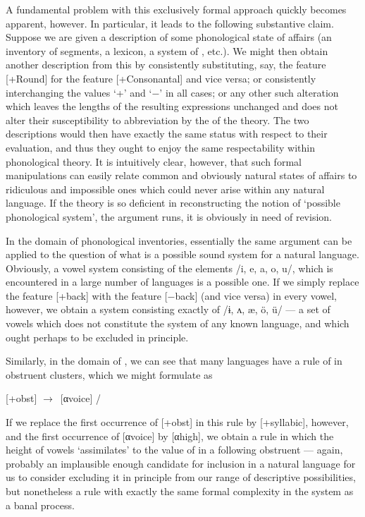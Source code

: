 A fundamental problem with this exclusively formal approach quickly
be\-comes apparent, however. In particular, it leads to the following
substantive claim. Suppose we are given a description of some
phonological state of affairs (an inventory of segments, a lexicon, a
system of , etc.). We might then obtain another
description from this by consistently substituting, say, the feature
[+Round] for the feature [+Consonantal] and vice versa; or
consistently interchanging the values `+' and `$-$' in all cases; or
any other such alteration which leaves the lengths of the resulting
expressions unchanged and does not alter their susceptibility to
abbreviation by the  of the theory. The two
descriptions would then have exactly the same status with respect to
their evaluation, and thus they ought to enjoy the same respectability
within phonological theory. It is intuitively clear, however, that
such formal manipulations can easily relate common and obviously
natural states of affairs to ridiculous and impossible ones which
could never arise within any natural language. If the theory is so
deficient in reconstructing the notion of `possible phonological
system', the argument runs, it is obviously in need of revision.

In the domain of phonological inventories, essentially the same
argument can be applied to the question of what is a possible sound
system for a natural language. Obviously, a vowel system consisting of
the elements /i, e, a, o, u/, which is encountered in a large number
of languages is a possible one. If we simply replace the feature
[+back] with the feature [$-$back] (and vice versa) in every vowel,
however, we obtain a system consisting exactly of /ɨ, ʌ, \ae, ö, ü/
--- a set of vowels which does not constitute the system of any known
language, and which ought perhaps to be excluded in principle.

Similarly, in the domain of , we can see that many
languages have a rule of   in obstruent clusters,
which we might formulate as

\begin{center} [+obst] $\rightarrow$\ [αvoice] /\gapline\
\end{center}

If we replace the first occurrence of [+obst] in this rule by
[+syllabic], however, and the first occurrence of [αvoice] by [αhigh],
we obtain a rule in which the height of vowels `assimilates' to the
value of \isi{voicing} in a following obstruent --- again, probably an
implausible enough candidate for inclusion in a natural language for
us to consider excluding it in principle from our range of descriptive
possibilities, but nonetheless a rule with exactly the same formal
complexity in the \textsl{\isi{SPE}} system as a banal  
process.

